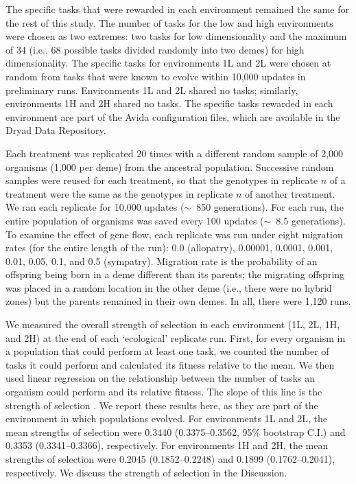 \begin{doublespace}
The specific tasks that were rewarded in each environment
remained the same for the rest of this study.
%
The number of tasks for the low and high environments
were chosen as two extremes: two tasks for low dimensionality
and the maximum of 34 (i.e., 68 possible tasks divided randomly
into two demes) for high dimensionality.
%
The specific tasks for environments 1L and 2L were chosen at random
from tasks that were known to evolve within 10,000 updates in preliminary runs.
%
Environments 1L and 2L shared no tasks;
similarly, environments 1H and 2H shared no tasks.
%
The specific tasks rewarded in each environment
are part of the Avida configuration files,
which are available in the Dryad Data Repository.



Each treatment was replicated 20 times
with a different random sample of 2,000 organisms (1,000 per deme)
from the ancestral population.
%
Successive random samples were reused for each treatment,
so that the genotypes in replicate $n$ of a treatment
were the same as the genotypes in replicate $n$ of another treatment.
%
We ran each replicate for 10,000 updates ($\sim$~850 generations).
%
For each run, the entire population of organisms
was saved every 100 updates ($\sim$~8.5 generations).
%
To examine the effect of gene flow,
each replicate was run under eight migration rates
(for the entire length of the run):
0.0 (allopatry), 0.00001, 0.0001, 0.001, 0.01, 0.05, 0.1, and 0.5 (sympatry).
%
Migration rate is the probability of an offspring
being born in a deme different than its parents;
the migrating offspring was placed in a random
location in the other deme (i.e., there were no hybrid zones)
but the parents remained in their own demes.
%
In all, there were 1,120 runs.



We measured the overall strength of selection in each environment
(1L, 2L, 1H, and 2H) at the end of each `ecological' replicate run.
%
First, for every organism in a population that could perform at least one task,
we counted the number of tasks it could perform
and calculated its fitness relative to the mean.
%
We then used linear regression on the relationship between
the number of tasks an organism could perform and its relative fitness.
%
The slope of this line is the strength of selection \citep{con04}.
%
We report these results here, as they are part of the environment
in which populations evolved.
%
For environments 1L and 2L, the mean strengths of selection were
0.3440 (0.3375--0.3562, 95\% bootstrap C.I.) and 0.3353 (0.3341--0.3366),
respectively.
%
For environments 1H and 2H, the mean strengths of selection were
0.2045 (0.1852--0.2248) and 0.1899 (0.1762--0.2041), respectively.
%
We discuss the strength of selection in the Discussion.




\end{doublespace}

